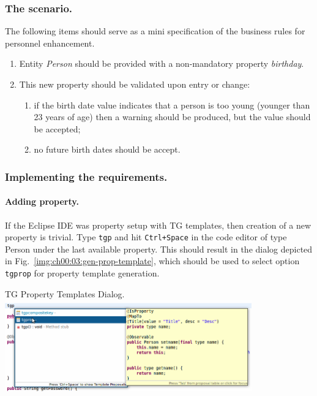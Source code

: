   \subsubsection*{The scenario.} 
  The following items should serve as a mini specification of the business rules for personnel enhancement.
  
  \begin{enumerate}
    \item Entity \emph{Person} should be provided with a non-mandatory property \emph{birthday}.
    \item This new property should be validated upon entry or change: 
	\begin{enumerate}
	  \item if the birth date value indicates that a person is too young (younger than 23 years of age) then a warning should be produced, but the value should be accepted;
	  \item no future birth dates should be accept.
	\end{enumerate}
  \end{enumerate}

  \subsubsection*{Implementing the requirements.}

  \paragraph*{Adding property.} 
  If the Eclipse IDE was property setup with TG templates, then creation of a new property is trivial.
  Type \texttt{tgp} and hit \texttt{Ctrl+Space} in the code editor of type Person under the last available property.
  This should result in the dialog depicted in Fig.~\ref{img:ch00:03:gen-prop-template}, which should be used to select option \texttt{tgprop} for property template generation.

  \begin{image}{TG Property Templates Dialog.}{\label{img:ch00:03:gen-prop-template}}
    \includegraphics[width=0.8\textwidth]{parts/00-part/chapters/02-making-changes/images/02-birthday-property-gen.png}
  \end{image}


